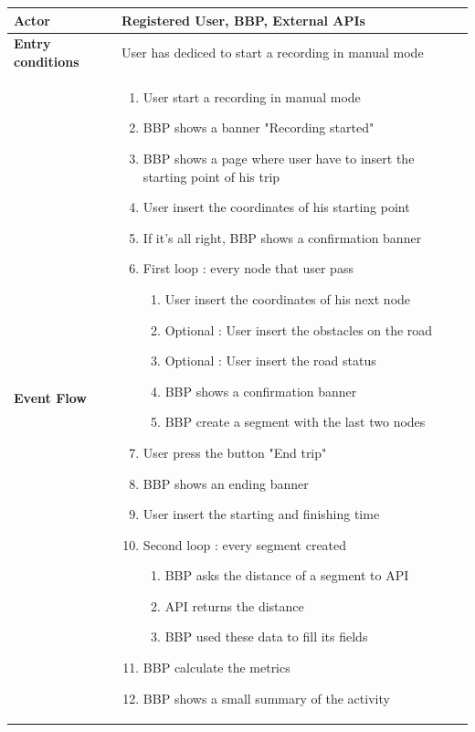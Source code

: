\begin{table}[htbp]
\centering
\renewcommand{\arraystretch}{1.4} 
\begin{tabularx}{\textwidth}{|p{3.5cm}|X|}
\hline
\textbf{Actor} & Registered User, BBP, External APIs \\ \hline
\textbf{Entry conditions} & User has dediced to start a recording in manual mode \\ \hline
\textbf{Event Flow} & \vspace{0pt}
\begin{enumerate}[nosep, leftmargin=*] 
    \item User start a recording in manual mode
    \item BBP shows a banner "Recording started"
    \item BBP shows a page where user have to insert the starting point of his trip
    \item User insert the coordinates of his starting point
    \item If it's all right, BBP shows a confirmation banner
    \item First loop : every node that user pass \begin{enumerate} 
        \item User insert the coordinates of his next node
        \item Optional : User insert the obstacles on the road
        \item Optional : User insert the road status
        \item BBP shows a confirmation banner
        \item BBP create a segment with the last two nodes
    \end{enumerate}
    \item User press the button "End trip"
    \item BBP shows an ending banner
    \item User insert the starting and finishing time
    \item Second loop : every segment created \begin{enumerate} 
        \item BBP asks the distance of a segment to API
        \item API returns the distance
        \item BBP used these data to fill its fields
    \end{enumerate} 
    \item BBP calculate the metrics
    \item BBP shows a small summary of the activity

\end{enumerate}
\end{tabularx}
\end{table}
